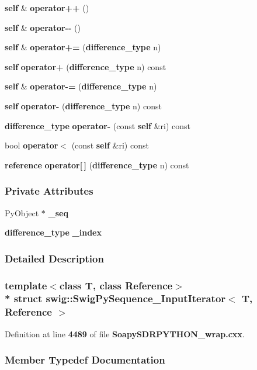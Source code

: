 \begin{DoxyCompactItemize}
{\bf self} \& {\bf operator++} ()
\item 
{\bf self} \& {\bf operator-\/-\/} ()
\item 
{\bf self} \& {\bf operator+=} ({\bf difference\+\_\+type} n)
\item 
{\bf self} {\bf operator+} ({\bf difference\+\_\+type} n) const 
\item 
{\bf self} \& {\bf operator-\/=} ({\bf difference\+\_\+type} n)
\item 
{\bf self} {\bf operator-\/} ({\bf difference\+\_\+type} n) const 
\item 
{\bf difference\+\_\+type} {\bf operator-\/} (const {\bf self} \&ri) const 
\item 
bool {\bf operator$<$} (const {\bf self} \&ri) const 
\item 
{\bf reference} {\bf operator[$\,$]} ({\bf difference\+\_\+type} n) const 
\end{DoxyCompactItemize}
\subsubsection*{Private Attributes}
\begin{DoxyCompactItemize}
\item 
Py\+Object $\ast$ {\bf \+\_\+seq}
\item 
{\bf difference\+\_\+type} {\bf \+\_\+index}
\end{DoxyCompactItemize}


\subsubsection{Detailed Description}
\subsubsection*{template$<$class T, class Reference$>$\\*
struct swig\+::\+Swig\+Py\+Sequence\+\_\+\+Input\+Iterator$<$ T, Reference $>$}



Definition at line {\bf 4489} of file {\bf Soapy\+S\+D\+R\+P\+Y\+T\+H\+O\+N\+\_\+wrap.\+cxx}.



\subsubsection{Member Typedef Documentation}
